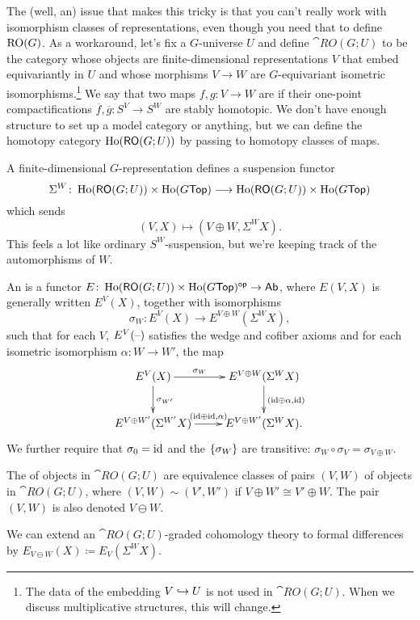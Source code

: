 The (well, an) issue that makes this tricky is that you can't really work with isomorphism classes of
representations, even though you need that to define $\mathrm{RO}(G)$. As a workaround, let's fix a $G$-universe $U$ and
define $\cat{RO}(G;U)$ to be the category whose objects are finite-dimensional representations $V$ that embed
equivariantly in $U$ and whose morphisms $V\to W$ are $G$-equivariant isometric isomorphisms.\footnote{The data of
the embedding $V\hookrightarrow U$ is not used in $\cat{RO}(G;U)$. When we discuss multiplicative structures, this will
change.} We say that two maps $f,g\colon V\to W$ are  if their one-point compactifications
$\overline f, \overline g\colon S^V\to S^W$ are stably homotopic. We don't have enough structure to set up a model
category or anything, but we can define the homotopy category $\operatorname{Ho}(\mathsf{RO}(G;U))$ by passing to homotopy classes
of maps.

A finite-dimensional $G$-representation defines a suspension functor
\[\Sigma^W\colon \operatorname{Ho}(\mathsf{RO}(G;U))\times\operatorname{Ho}(G\mathsf{Top})\longrightarrow \operatorname{Ho}(\mathsf{RO}(G;U))\times\operatorname{Ho}(G\mathsf{Top})\]
which sends
\[(V,X)\mapsto (V\oplus W, \Sigma^W X).\]
This feels a lot like ordinary $S^W$-suspension, but we're keeping track of the automorphisms of $W$.
\begin{defn}
An  is a functor $E\colon\operatorname{Ho}(\mathsf{RO}(G;U))\times\operatorname{Ho}(G\mathsf{Top})^{\mathsf{op}}\to\mathsf{Ab}$,
where $E(V,X)$ is generally written $E^V(X)$, together with
isomorphisms
\[\sigma_W\colon E^V(X)\longrightarrow E^{V\oplus W}(\Sigma^W X),\]
such that for each $V$, $E^V(\text{--})$ satisfies the wedge and cofiber axioms and for each isometric isomorphism
$\alpha\colon W\to W'$, the map
\[\xymatrix{
	E^V(X)\ar[r]^-{\sigma_W}\ar[d]^{\sigma_{W'}} & E^{V\oplus W}(\Sigma^W X)\ar[d]^{(\id\oplus\alpha, \id)}\\
	E^{V\oplus W'}(\Sigma^{W'}X)\ar[r]^{(\id\oplus\id, \alpha)} & E^{V\oplus W'}(\Sigma^W X).
}\]
We further require that $\sigma_0 = \mathrm{id}$ and the $\{\sigma_W\}$ are transitive: $\sigma_W\circ\sigma_V =
\sigma_{V\oplus W}$.
\end{defn}
\begin{defn}
The  of objects in $\cat{RO}(G;U)$ are equivalence classes of pairs $(V,W)$ of objects in
$\cat{RO}(G;U)$, where $(V,W)\sim(V',W')$ if $V\oplus W'\cong V'\oplus W$. The pair $(V,W)$ is also denoted
$V\ominus W$.
\end{defn}
We can extend an $\cat{RO}(G;U)$-graded cohomology theory to formal differences by $E_{V\ominus W}(X)\coloneqq
E_V(\Sigma^W X)$.

